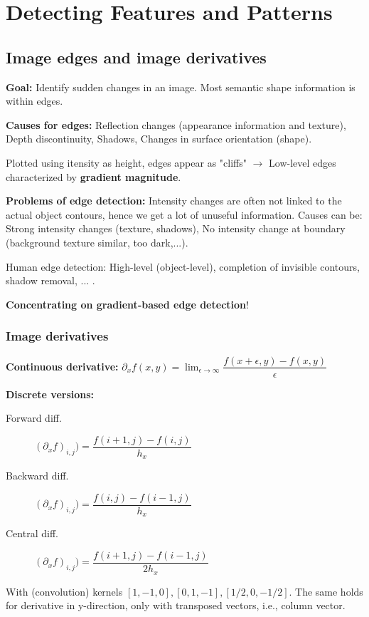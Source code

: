 \chapter{Detecting Features and Patterns}

\section{Image edges and image derivatives}

\textbf{Goal:} Identify sudden changes in an image. Most semantic shape information is within edges.

\textbf{Causes for edges:} Reflection changes (appearance information and texture), Depth discontinuity, Shadows, Changes in surface orientation (shape).

Plotted using itensity as height, edges appear as "cliffs" $\rightarrow$ Low-level edges characterized by \textbf{gradient magnitude}.

\textbf{Problems of edge detection:} Intensity changes are often not linked to the actual object contours, hence we get a lot of unuseful information. Causes can be: Strong intensity changes (texture, shadows), No intensity change at boundary (background texture similar, too dark,...).

Human edge detection: High-level (object-level), completion of invisible contours, shadow removal, ... .

\textbf{Concentrating on gradient-based edge detection}!

\subsection{Image derivatives}

\textbf{Continuous derivative:} $\partial_x f(x,y) = \lim_{\epsilon \rightarrow \infty} \dfrac{f(x + \epsilon, y) -f(x,y)}{\epsilon}$

\textbf{Discrete versions:}

\begin{description}
    \item[Forward diff.] $(\partial_x f)_{i,j}) = \dfrac{f(i+1,j) - f(i,j)}{h_x}$
    \item[Backward diff.] $(\partial_x f)_{i,j}) = \dfrac{f(i,j) - f(i-1,j)}{h_x}$
    \item[Central diff.] $(\partial_x f)_{i,j}) = \dfrac{f(i+1,j) - f(i-1,j)}{2h_x}$
\end{description}

With (convolution) kernels $[1,-1,0], [0,1,-1], [1/2, 0, -1/2]$. The same holds for derivative in y-direction, only with transposed vectors, i.e., column vector.

